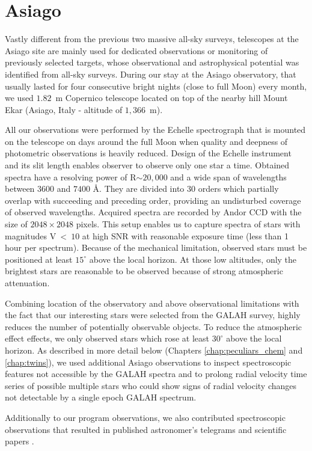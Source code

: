 \begin{itemize}
\end{itemize}

\section{Asiago}
\label{sec:asiago_data}
Vastly different from the previous two massive all-sky surveys, telescopes at the Asiago site are mainly used for dedicated observations or monitoring of previously selected targets, whose observational and astrophysical potential was identified from all-sky surveys. During our stay at the Asiago observatory, that usually lasted for four consecutive bright nights (close to full Moon) every month, we used $1.82$~m Copernico telescope located on top of the nearby hill Mount Ekar (Asiago, Italy - altitude of $1,366$~m).

All our observations were performed by the Echelle spectrograph that is mounted on the telescope on days around the full Moon when quality and deepness of photometric observations is heavily reduced. Design of the Echelle instrument and its slit length enables observer to observe only one star a time. Obtained spectra have a resolving power of R$\sim20,000$ and a wide span of wavelengths between $3600$ and $7400$ \AA. They are divided into 30 orders which partially overlap with succeeding and preceding order, providing an undisturbed coverage of observed wavelengths. Acquired spectra are recorded by Andor CCD with the size of $2048 \times 2048$ pixels. This setup enables us to capture spectra of stars with magnitudes V~<~$10$ at high SNR with reasonable exposure time (less than 1 hour per spectrum). Because of the mechanical limitation, observed stars must be positioned at least $15^\circ$ above the local horizon. At those low altitudes, only the brightest stars are reasonable to be observed because of strong atmospheric attenuation.

Combining location of the observatory and above observational limitations with the fact that our interesting stars were selected from the GALAH survey, highly reduces the number of potentially observable objects. To reduce the atmospheric effect effects, we only observed stars which rose at least $30^\circ$ above the local horizon. As described in more detail below (Chapters \ref{chap:peculiars_chem} and \ref{chap:twins}), we used additional Asiago observations to inspect spectroscopic features not accessible by the GALAH spectra and to prolong radial velocity time series of possible multiple stars who could show signs of radial velocity changes not detectable by a single epoch GALAH spectrum.

Additionally to our program observations, we also contributed spectroscopic observations that resulted in published astronomer's telegrams \citep{2019ATel13340....1M} and scientific papers \citep{2019MNRAS.488.5536M}.